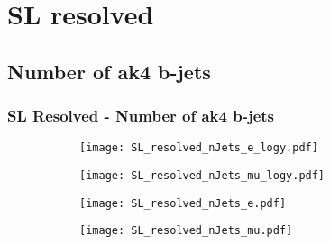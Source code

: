 \documentclass[aspectratio=169,8pt]{beamer}
\begin{document}
\section{SL resolved}

\subsection{Number of ak4 b-jets}
\begin{frame}
\frametitle{SL Resolved - Number of ak4 b-jets}
\begin{figure}
\captionsetup[subfigure]{labelformat=empty}
\begin{subfigure}{0.375\textwidth}
\texttt{[image: SL\_resolved\_nJets\_e\_logy.pdf]}
\vspace*{-0.15cm}
\end{subfigure}
\hfil
\begin{subfigure}{0.375\textwidth}
\texttt{[image: SL\_resolved\_nJets\_mu\_logy.pdf]}
\vspace*{-0.15cm}
\end{subfigure}
\hfil
\begin{subfigure}{0.375\textwidth}
\texttt{[image: SL\_resolved\_nJets\_e.pdf]}
\vspace*{-0.15cm}
\end{subfigure}
\hfil
\begin{subfigure}{0.375\textwidth}
\texttt{[image: SL\_resolved\_nJets\_mu.pdf]}
\vspace*{-0.15cm}
\end{subfigure}
\hfil
\end{figure}
\end{frame}
\newpage
\end{document}

